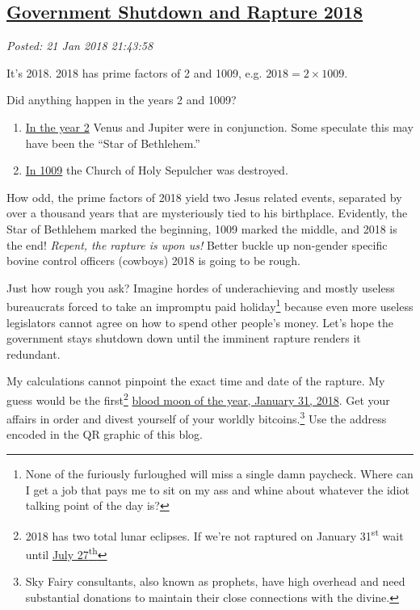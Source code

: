 %

\subsection*{\href{https://analyzethedatanotthedrivel.org/2018/01/21/government-shutdown-and-rapture-2018/}{Government Shutdown and Rapture 2018}}


\noindent\emph{Posted: 21 Jan 2018 21:43:58}
\vspace{6pt}

It's 2018. 2018 has prime factors of 2 and 1009, e.g. $2018 = 2 \times 1009$.

\medskip

Did anything happen in the years 2 and 1009?

\begin{enumerate}
\def\labelenumi{\arabic{enumi}.}
\item
  \href{https://www.onthisday.com/events/date/2}{In the year 2} Venus
  and Jupiter were in conjunction. Some speculate this may have been the
  ``Star of Bethlehem.''
\item
  \href{https://www.onthisday.com/events/october/18}{In 1009} the Church
  of Holy Sepulcher was destroyed.
\end{enumerate}

How odd, the prime factors of 2018 yield two Jesus related events,
separated by over a thousand years that are mysteriously tied to his
birthplace. Evidently, the Star of Bethlehem marked the beginning, 1009
marked the middle, and 2018 is the end! \emph{Repent, the rapture is
upon us!} Better buckle up non-gender specific bovine control officers
(cowboys) 2018 is going to be rough.

Just how rough you ask? Imagine hordes of underachieving and mostly
useless bureaucrats forced to take an impromptu paid
holiday\footnote{None of the furiously furloughed will miss a single damn paycheck.
 Where can I get a job that pays me to sit on my ass and whine about
 whatever the idiot talking point of the day
 is?
} because even more
useless legislators cannot agree on how to spend other people's money.
Let's hope the government stays shutdown down until the imminent rapture
renders it redundant.

My calculations cannot pinpoint the exact time and date of the rapture.
My guess would be the first\footnote{2018 has two total lunar eclipses. If we're not
 raptured on January 31\textsuperscript{st} wait until
 \href{https://eclipse.gsfc.nasa.gov/LEplot/LEplot2001/LE2018Jul27T.pdf}{July
 27\textsuperscript{th}}
}
\href{https://eclipse.gsfc.nasa.gov/LEplot/LEplot2001/LE2018Jan31T.pdf}{blood
moon of the year, January 31, 2018}. Get your affairs in order and
divest yourself of your worldly
bitcoins.\footnote{Sky Fairy consultants, also known as prophets, have high overhead and
 need substantial donations to maintain their close connections with
 the divine.
} Use the address
encoded in the QR graphic of this blog.

